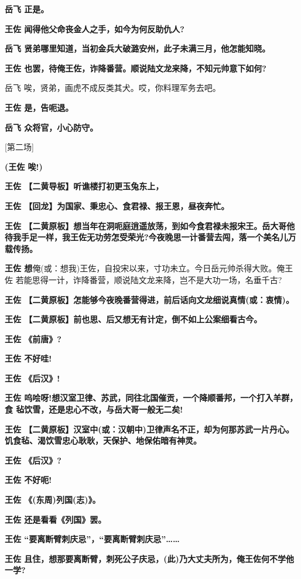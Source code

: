 \textbf{岳飞 正是。}

\textbf{王佐 闻得他父命丧金人之手，如今为何反助仇人?}

\textbf{岳飞
贤弟哪里知道，当初金兵大破潞安州，此子未满三月，他怎能知晓。}

\textbf{王佐
也罢，待俺王佐，诈降番营。顺说陆文龙来降，不知元帅意下如何?}

岳飞 唉，贤弟，画虎不成反类其犬。哎，你料理军务去吧。

\textbf{王佐 是，告呃退。}

\textbf{岳飞 众将官，小心防守。}

{[}第二场{]}

\textbf{(王佐 唉!)}

\textbf{王佐 【二黄导板】听谯楼打初更玉兔东上，}

\textbf{王佐 【回龙】为国家、秉忠心、食君禄、报王恩，昼夜奔忙。}

\textbf{王佐
【二黄原板】想当年在洞呃庭逍遥放荡，到如今食君禄未报宋王。岳大哥他待我手足一样，我王佐无功劳怎受荣光?今夜晚思一计番营去闯，落一个美名儿万载传扬。}

\textbf{王佐
想}俺(或：想我)王佐，自投宋以来，寸功未立。今日岳元帅杀得大败。俺王佐
若能思得一计，诈降番营，顺说陆文龙来降，岂不是大功一场，名垂千古?

\textbf{王佐
【二黄原板】怎能够今夜晚番营得进，前后话向文龙细说真情(或：衷情)。}

\textbf{王佐 【二黄原板】前也思、后又想无有计定，倒不如上公案细看古今。}

\textbf{王佐 《前唐》?}

\textbf{王佐 不好哇!}

\textbf{王佐 《后汉》!}

\textbf{王佐
呜哙呀!想汉室卫律、苏武，同往北国催贡，一个降顺番邦，一个打入羊群，食
毡饮雪，还是忠心不改，与岳大哥一般无二矣!}

\textbf{王佐
【二黄原板】汉室中(或：汉朝中)卫律声名不正，却为何那苏武一片丹心。饥食毡、渴饮雪忠心耿耿，天保护、地保佑暗有神灵。}

\textbf{王佐 《后汉》?}

\textbf{王佐 不好呃!}

\textbf{王佐 《(东周)列国(志)》。}

\textbf{王佐 还是看看《列国》罢。}

\textbf{王佐 ``要离断臂刺庆忌''，``要离断臂刺庆忌''\ldots{}\ldots{}}

\textbf{王佐
且住，想那要离断臂，刺死公子庆忌，(此)乃大丈夫所为，俺王佐何不学他一学?}

